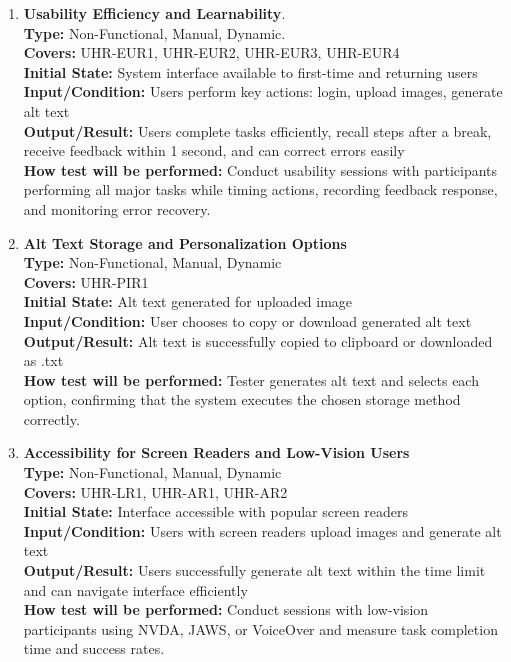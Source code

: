 \documentclass[12pt, titlepage]{article}
\begin{document}
\begin{enumerate}[label=NFR-ST \arabic*., wide=0pt, leftmargin=*]
  \item \textbf{Usability Efficiency and Learnability}. \\[2mm]
    \textbf{Type:} Non-Functional, Manual, Dynamic. \\
    \textbf{Covers:} UHR-EUR1, UHR-EUR2, UHR-EUR3, UHR-EUR4 \\
    \textbf{Initial State:} System interface available to first-time
    and returning users \\
    \textbf{Input/Condition:} Users perform key actions: login,
    upload images, generate alt text \\
    \textbf{Output/Result:} Users complete tasks efficiently, recall
    steps after a break, receive feedback within 1 second, and can
    correct errors easily \\[2mm]
    \textbf{How test will be performed:} Conduct usability sessions
    with participants performing all major tasks while timing
    actions, recording feedback response, and monitoring error recovery.

  \item \textbf{Alt Text Storage and Personalization Options} \\[2mm]
    \textbf{Type:} Non-Functional, Manual, Dynamic \\
    \textbf{Covers:} UHR-PIR1 \\
    \textbf{Initial State:} Alt text generated for uploaded image \\
    \textbf{Input/Condition:} User chooses to copy or download
    generated alt text \\
    \textbf{Output/Result:} Alt text is successfully copied to
    clipboard or downloaded as .txt \\[2mm]
    \textbf{How test will be performed:} Tester generates alt text
    and selects each option, confirming that the system executes the
    chosen storage method correctly.

  \item \textbf{Accessibility for Screen Readers and Low-Vision Users} \\[2mm]
    \textbf{Type:} Non-Functional, Manual, Dynamic \\
    \textbf{Covers:} UHR-LR1, UHR-AR1, UHR-AR2\\
    \textbf{Initial State:} Interface accessible with popular screen readers \\
    \textbf{Input/Condition:} Users with screen readers upload images
    and generate alt text \\
    \textbf{Output/Result:} Users successfully generate alt text
    within the time limit and can navigate interface efficiently \\[2mm]
    \textbf{How test will be performed:} Conduct sessions with
    low-vision participants using NVDA, JAWS, or VoiceOver and
    measure task completion time and success rates.


\end{enumerate}
\end{document}

